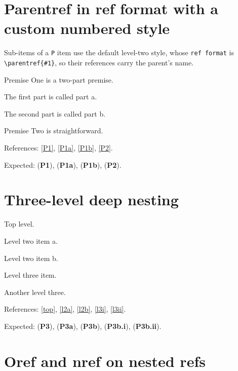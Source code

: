 \documentclass{article}
\begin{document}
\section{Parentref in ref format with a custom numbered style}

Sub-items of a \texttt{P} item use the default level-two style, whose
\texttt{ref format} is \verb|\parentref{#1}|, so their references carry the
parent's name.

\begin{prop}
  \item[style=P] Premise One is a two-part premise. \label{P1}
  \begin{prop}
    \item The first part is called part a. \label{P1a}
    \item The second part is called part b. \label{P1b}
  \end{prop}
  \item[style=P] Premise Two is straightforward. \label{P2}
\end{prop}

References: \ref{P1}, \ref{P1a}, \ref{P1b}, \ref{P2}.

Expected: (\textbf{P1}), (\textbf{P1a}), (\textbf{P1b}), (\textbf{P2}).

\section{Three-level deep nesting}

\begin{prop}
  \item[style=P] Top level. \label{top}
  \begin{prop}
    \item Level two item a. \label{l2a}
    \item Level two item b. \label{l2b}
    \begin{prop}
      \item Level three item. \label{l3i}
      \item Another level three. \label{l3ii}
    \end{prop}
  \end{prop}
\end{prop}

References: \ref{top}, \ref{l2a}, \ref{l2b}, \ref{l3i}, \ref{l3ii}.

Expected: (\textbf{P3}), (\textbf{P3a}), (\textbf{P3b}), (\textbf{P3b.i}),
(\textbf{P3b.ii}).

\section{Oref and nref on nested refs}
\end{document}
